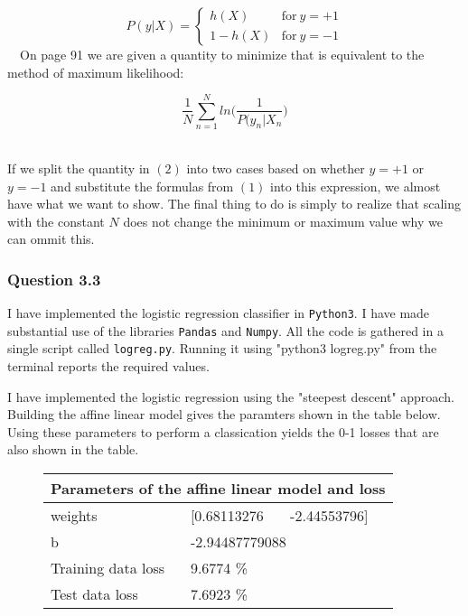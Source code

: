 \documentclass{article}
\begin{document}
\begin{equation}
  P(y \vert X) =
  \begin{cases}
    h(X) & \text{for}\ y=+1 \\
    1-h(X) & \text{for}\ y=-1
  \end{cases}
\end{equation}
\
\
On page 91 we are given a quantity to minimize that is equivalent to the method
of maximum likelihood:

\begin{equation}
\dfrac{1}{N}\displaystyle\sum_{n=1}^{N} ln\bigg(\frac{1}{P(y_n \vert X_n} \bigg)
\end{equation}
\
\

If we split the quantity in \((2)\) into two cases based on whether \(y=+1\) or
\(y=-1\) and substitute the formulas from \((1)\) into this expression, we
almost have what we want to show. The final thing to do is simply to realize
that scaling with the constant \(N\) does not change the minimum or maximum
value why we can ommit this.
\vspace{1cm}


\subsubsection*{Question 3.3}
I have implemented the logistic regression classifier in \texttt{Python3}. I
have made substantial use of the libraries \texttt{Pandas} and
\texttt{Numpy}. All the code is gathered in a single script called
\texttt{logreg.py}. Running it using "python3 logreg.py" from the terminal
reports the required values.

I have implemented the logistic regression using the "steepest descent"
approach. Building the affine linear model gives the paramters shown in the
table below. Using these parameters to perform a classication yields the 0-1
losses that are also shown in the table.

\begin{figure}[h]
\centering
\begin{tabular}{ |p{5cm}||p{5cm}|  }
 \hline
 \multicolumn{2}{|c|}{Parameters of the affine linear model and loss}\\
 \hline
 weights   & [0.68113276 \ \ \ -2.44553796] \\
 b  & -2.94487779088 \\
 Training data loss & 9.6774 \% \\
 Test data loss & 7.6923 \% \\
 \hline
\end{tabular}
\end{figure}


\printbibliography
\end{document}
